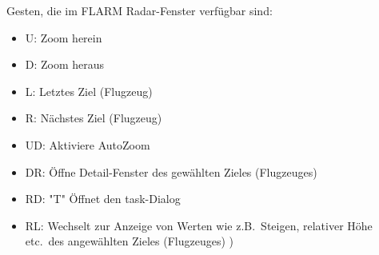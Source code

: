 Gesten, die im FLARM Radar-Fenster verfügbar sind:
\begin{itemize}
\item U: Zoom herein
\item D: Zoom heraus
\item L: Letztes Ziel (Flugzeug)
\item R: Nächstes Ziel (Flugzeug)
\item UD: Aktiviere AutoZoom
\item DR: Öffne Detail-Fenster des gewählten Zieles (Flugzeuges)
\item RD: "T" Öffnet den task-Dialog
\item RL: Wechselt zur Anzeige von Werten wie z.B.\ Steigen, relativer Höhe etc.\ des angewählten Zieles (Flugzeuges) )
\end{itemize}
